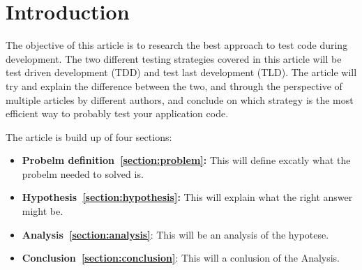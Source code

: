 \section{Introduction}
\label{section:intro}



The objective of this article is to research the best approach to test code during development. 
The two different testing strategies covered in this article will be test driven development (TDD) and test last development (TLD). 
The article will try and explain the difference between the two, and through the perspective of multiple articles by different authors, 
and conclude on which strategy is the most efficient way to probably test your application code.  

The article is build up of four sections:
\begin{itemize}
\item \textbf{Probelm definition~\ref{section:problem}:}
This will define excatly what the probelm needed to solved is.
\item \textbf{Hypothesis~\ref{section:hypothesis}:}
This will explain what the right answer might be. 
\item \textbf{Analysis~\ref{section:analysis}}:
This will be an analysis of the hypotese.
\item \textbf{Conclusion~\ref{section:conclusion}}:
This will a conlusion of the Analysis.
\end{itemize}
